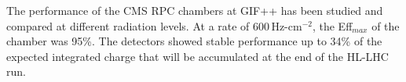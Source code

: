 The performance of the CMS RPC chambers at GIF++ has been studied and compared at different radiation levels. At a rate of 600\,Hz-cm$^{-2}$, the Eff$_{max}$ of the chamber was 95\%. 
The detectors showed stable performance up to 34\% of the expected integrated charge that will be accumulated at the end of the HL-LHC run. 




